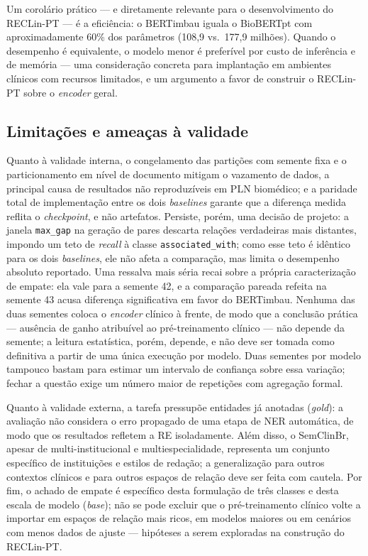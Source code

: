 \documentclass[12pt]{article}
\begin{document}
Um corolário prático --- e diretamente relevante para o desenvolvimento do
RECLin-PT --- é a eficiência: o BERTimbau iguala o BioBERTpt com aproximadamente
60\% dos parâmetros (108,9 vs.\ 177,9 milhões). Quando o desempenho é
equivalente, o modelo menor é preferível por custo de inferência e de memória ---
uma consideração concreta para implantação em ambientes clínicos com recursos
limitados, e um argumento a favor de construir o RECLin-PT sobre o \emph{encoder}
geral.

\subsection{Limitações e ameaças à validade}
Quanto à validade interna, o congelamento das partições com semente fixa e o
particionamento em nível de documento mitigam o vazamento de dados, a principal
causa de resultados não reproduzíveis em PLN biomédico; e a paridade total de
implementação entre os dois \emph{baselines} garante que a diferença medida
reflita o \emph{checkpoint}, e não artefatos. Persiste, porém, uma decisão de
projeto: a janela \texttt{max\_gap} na geração de pares descarta relações
verdadeiras mais distantes, impondo um teto de \emph{recall} à classe
\texttt{associated\_with}; como esse teto é idêntico para os dois \emph{baselines},
ele não afeta a comparação, mas limita o desempenho absoluto reportado. Uma
ressalva mais séria recai sobre a própria caracterização de empate: ela vale para
a semente 42, e a comparação pareada refeita na semente 43 acusa diferença
significativa em favor do BERTimbau. Nenhuma das duas sementes coloca o
\emph{encoder} clínico à frente, de modo que a conclusão prática --- ausência de
ganho atribuível ao pré-treinamento clínico --- não depende da semente; a leitura
estatística, porém, depende, e não deve ser tomada como definitiva a partir de uma
única execução por modelo. Duas sementes por modelo tampouco bastam para estimar
um intervalo de confiança sobre essa variação; fechar a questão exige um número
maior de repetições com agregação formal.

Quanto à validade externa, a tarefa pressupõe entidades já anotadas
(\emph{gold}): a avaliação não considera o erro propagado de uma etapa de NER
automática, de modo que os resultados refletem a RE isoladamente. Além disso, o
SemClinBr, apesar de multi-institucional e multiespecialidade, representa um
conjunto específico de instituições e estilos de redação; a generalização para
outros contextos clínicos e para outros espaços de relação deve ser feita com
cautela. Por fim, o achado de empate é específico desta formulação de três
classes e desta escala de modelo (\emph{base}); não se pode excluir que o
pré-treinamento clínico volte a importar em espaços de relação mais ricos, em
modelos maiores ou em cenários com menos dados de ajuste --- hipóteses a serem
exploradas na construção do RECLin-PT.
\end{document}
